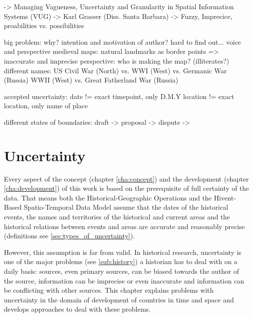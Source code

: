 
  -> Managing Vagueness, Uncertainty and Granularity in Spatial Information Systems (VUG)
  -> Karl Grasser (Diss. Santa Barbara)
  -> Fuzzy, Imprecice,
  proabilities vs. possibilities

big problem: why? intention and motivation of author? hard to find out...
voice and perspective
medieval maps: natural landmarks as border points => inaccurate and imprecise
perspective: who is making the map? (illiterates?)
different names:
  US Civil War (North) vs.
  WWI (West) vs. Germanic War (Russia)
  WWII (West) vs. Great Fatherland War (Russia)

accepted uncertainty: date != exact timepoint, only D.M.Y
                      location != exact location, only name of place

\cite[chapter 2, p. 51]{solana2014spatio}


different states of boundaries: draft -> proposal -> dispute ->



\chapter{Uncertainty} %
\label{cha:uncertainty}

Every aspect of the concept (chapter \ref{cha:concept}) and the development (chapter \ref{cha:development}) of this work is based on the prerequisite of full certainty of the data. That means both the Historical-Geographic Operations and the Hivent-Based Spatio-Temporal Data Model assume that the dates of the historical events, the names and territories of the historical and current areas and the historical relations between events and areas are accurate and reasonably precise (definitions see \ref{sec:types_of_uncertainty}).

However, this assumption is far from valid. In historical research, uncertainty is one of the major problems (see \ref{sub:history}) a historian has to deal with on a daily basis: sources, even primary sources, can be biased towards the author of the source, information can be imprecise or even inaccurate and information can be conflicting with other sources. This chapter explains problems with uncertainty in the domain of development of countries in time and space and develops approaches to deal with these problems.


